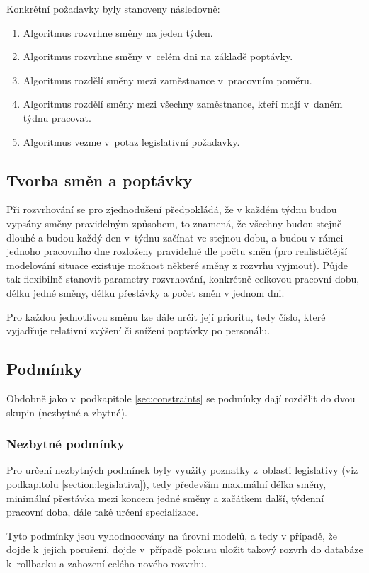 \documentclass[twoside]{ctuthesis}
\begin{document}
Konkrétní požadavky byly stanoveny následovně:
\begin{enumerate}
	\item Algoritmus rozvrhne směny na jeden týden.
	\item Algoritmus rozvrhne směny v~celém dni na základě poptávky.
	\item Algoritmus rozdělí směny mezi zaměstnance v~pracovním poměru.
	\item Algoritmus rozdělí směny mezi všechny zaměstnance, kteří mají v~daném týdnu pracovat.
	\item Algoritmus vezme v~potaz legislativní požadavky.
\end{enumerate}

\subsection{Tvorba směn a poptávky}\label{sub:demand}
Při rozvrhování se pro zjednodušení předpokládá, že v každém týdnu budou vypsány směny pravidelným způsobem, to znamená, že všechny budou stejně dlouhé a budou každý den v~týdnu začínat ve stejnou dobu, a budou v rámci jednoho pracovního dne rozloženy pravidelně dle počtu směn (pro realističtější modelování situace existuje možnost některé směny z rozvrhu vyjmout). Půjde tak flexibilně stanovit parametry rozvrhování, konkrétně celkovou pracovní dobu, délku jedné směny, délku přestávky a počet směn v jednom dni. 

Pro každou jednotlivou směnu lze dále určit její prioritu, tedy číslo, které vyjadřuje relativní zvýšení či snížení poptávky po personálu.

\subsection{Podmínky}
Obdobně jako v~podkapitole \ref{sec:constraints} se podmínky dají rozdělit do dvou skupin (nezbytné a zbytné).

\subsubsection{Nezbytné podmínky}
Pro určení nezbytných podmínek byly využity poznatky z~oblasti legislativy (viz podkapitolu \ref{section:legislativa}), tedy především maximální délka směny, minimální přestávka mezi koncem jedné směny a začátkem další, týdenní pracovní doba, dále také určení specializace.

Tyto podmínky jsou vyhodnocovány na úrovni modelů, a tedy v případě, že dojde k~jejich porušení, dojde v~případě pokusu uložit takový rozvrh do databáze k~rollbacku a zahození celého nového rozvrhu.
\end{document}
